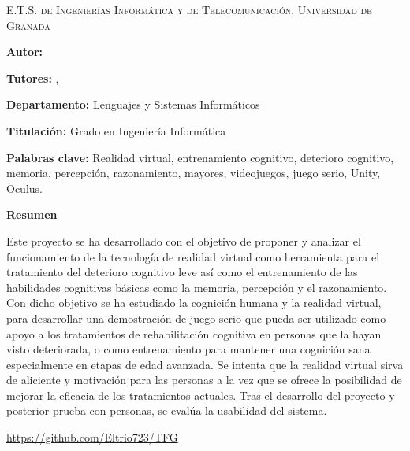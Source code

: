 
\pagestyle{fancy}
\renewcommand{\headrulewidth}{0pt}

\begin{center}
	\scshape
	E.T.S. de Ingenierías Informática y de Telecomunicación, Universidad de Granada
\end{center}

\bigskip

\begin{center}
	\Large \scshape
	\textbf{\tfgtitlename}
\end{center}

\bigskip \bigskip \bigskip

\begin{minipage}{\textwidth}

\textbf{Autor:} \tfgauthorname

\medskip

\textbf{Tutores:} \tfgtutornameA , \tfgtutornameB

\medskip


\medskip

\textbf{Departamento:} Lenguajes y Sistemas Informáticos

\medskip

\textbf{Titulación:} Grado en Ingeniería Informática

\medskip

\textbf{Palabras clave:} Realidad virtual, entrenamiento cognitivo, deterioro cognitivo, memoria, percepción, razonamiento, mayores, videojuegos, juego serio, Unity, Oculus.

\bigskip \bigskip


\end{minipage}

\begin{center}
	\textbf{Resumen}
\end{center}





Este proyecto se ha desarrollado con el objetivo de proponer y analizar el funcionamiento de la tecnología de realidad virtual como herramienta para el tratamiento del deterioro cognitivo leve así como el entrenamiento de las habilidades cognitivas básicas como la memoria, percepción y el razonamiento. Con dicho objetivo se ha estudiado la cognición humana y la realidad virtual, para desarrollar una demostración de juego serio que pueda ser utilizado como apoyo a los tratamientos de rehabilitación cognitiva en personas que la hayan visto deteriorada, o como entrenamiento para mantener una cognición sana especialmente en etapas de edad avanzada. Se intenta que la realidad virtual sirva de aliciente y motivación para las personas a la vez que se ofrece la posibilidad de mejorar la eficacia de los tratamientos actuales. Tras el desarrollo del proyecto y posterior prueba con personas, se evalúa la usabilidad del sistema.


\url{https://github.com/Eltrio723/TFG}

\blankpage
